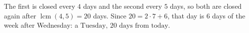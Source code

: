 The first is closed every $4$ days and the second every $5$ days, so both are closed again after $\operatorname{lcm}(4,5)=20$ days. Since $20=2\cdot7+6$, that day is $6$ days of the week after Wednesday: a $\boxed{\text{Tuesday, }20\text{ days from today}}$.
